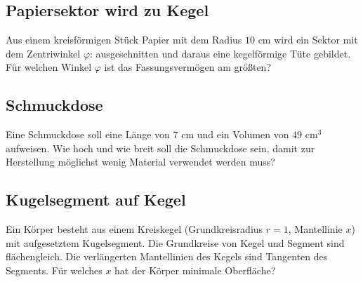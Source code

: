 \subsection{Papiersektor wird zu Kegel}

Aus einem kreisförmigen Stück Papier mit dem Radius  $10 \text{ cm}$ wird ein Sektor mit dem Zentriwinkel $\varphi$: ausgeschnitten und daraus eine kegelförmige Tüte gebildet. Für welchen Winkel $\varphi$ ist das Fassungsvermögen am größten?






\subsection{Schmuckdose}

Eine Schmuckdose soll eine Länge von $7 \text{ cm}$ und ein Volumen
von $49 \text{ cm}^3$ aufweisen. Wie hoch und wie breit soll die
Schmuckdose sein, damit zur Herstellung möglichst wenig Material
verwendet werden muss?





\subsection{Kugelsegment auf Kegel}
Ein Körper besteht aus einem Kreiskegel (Grundkreisradius $r=1$,
Mantellinie $x$) mit aufgesetztem Kugelsegment.
Die Grundkreise von Kegel und Segment sind flächengleich.
Die verlängerten Mantellinien des Kegels sind Tangenten des
Segments. Für welches $x$ hat der Körper minimale Oberfläche?







